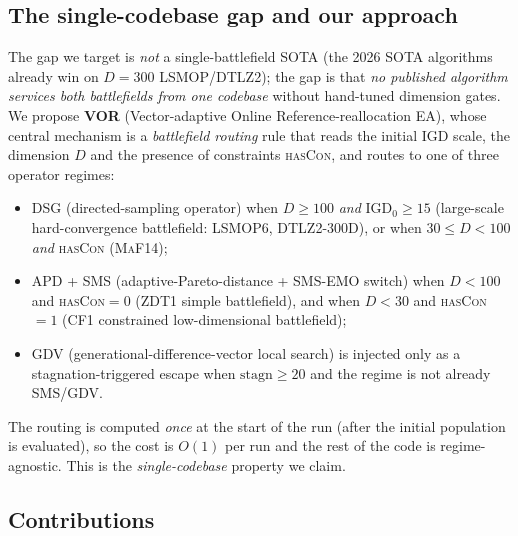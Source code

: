 \documentclass[preprint,12pt]{elsarticle}
\begin{document}
\subsection{The single-codebase gap and our approach}

The gap we target is \emph{not} a single-battlefield SOTA (the 2026 SOTA
algorithms already win on $D=300$ \textsc{LSMOP}/\textsc{DTLZ2}); the gap is
that \emph{no published algorithm services both battlefields from one
codebase} without hand-tuned dimension gates. We propose
\textbf{VOR} (Vector-adaptive Online Reference-reallocation EA), whose
central mechanism is a \emph{battlefield routing} rule that reads the
initial IGD scale, the dimension $D$ and the presence of constraints
\textsc{hasCon}, and routes to one of three operator regimes:
\begin{itemize}
\item \textsc{DSG} (directed-sampling operator) when
$D\ge 100$ \emph{and} $\mathrm{IGD}_0\ge 15$ (large-scale hard-convergence
battlefield: \textsc{LSMOP6}, \textsc{DTLZ2}-300D), or when
$30\le D<100$ \emph{and} \textsc{hasCon} (\textsc{MaF14});
\item \textsc{APD} + \textsc{SMS} (adaptive-Pareto-distance +
  \textsc{SMS-EMO} switch) when $D<100$ and \textsc{hasCon}$=0$
  (\textsc{ZDT1} simple battlefield), and when $D<30$ and \textsc{hasCon}$=1$
  (\textsc{CF1} constrained low-dimensional battlefield);
\item \textsc{GDV} (generational-difference-vector local search) is
injected only as a stagnation-triggered escape when
$\mathrm{stagn}\ge 20$ and the regime is not already \textsc{SMS}/\textsc{GDV}.
\end{itemize}
The routing is computed \emph{once} at the start of the run (after the
initial population is evaluated), so the cost is $O(1)$ per run and the
rest of the code is regime-agnostic. This is the \emph{single-codebase}
property we claim.

\subsection{Contributions}
\end{document}
